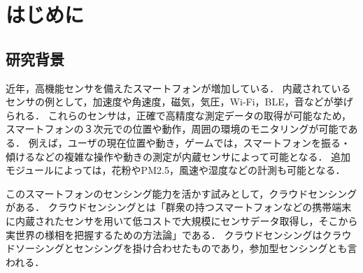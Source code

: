 \chapter{はじめに}
\thispagestyle{myheadings}


\section{研究背景}
\label{sec:schedule}

近年，高機能センサを備えたスマートフォンが増加している．
内蔵されているセンサの例として，加速度や角速度，磁気，気圧，Wi-Fi，BLE，音などが挙げられる．
これらのセンサは，正確で高精度な測定データの取得が可能なため，スマートフォンの３次元での位置や動作，周囲の環境のモニタリングが可能である．
例えば，ユーザの現在位置や動き，ゲームでは，スマートフォンを振る・傾けるなどの複雑な操作や動きの測定が内蔵センサによって可能となる．
追加モジュールによっては，花粉やPM2.5，風速や湿度などの計測も可能となる．

このスマートフォンのセンシング能力を活かす試みとして，クラウドセンシングがある．
クラウドセンシングとは「群衆の持つスマートフォンなどの携帯端末に内蔵されたセンサを用いて低コストで大規模にセンサデータ取得し，そこから実世界の様相を把握するための方法論\cite{weko}」である．
クラウドセンシングはクラウドソーシングとセンシングを掛け合わせたものであり，参加型センシングとも言われる．


